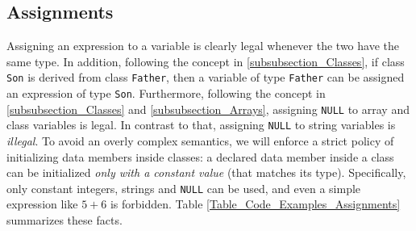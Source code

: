 \documentclass{article}
\begin{document}
\subsection{Assignments}
\label{subsection_Assignments}
Assigning an expression to a variable is clearly legal whenever the two have the same type.
In addition, following the concept in \ref{subsubsection_Classes},
if class \verb"Son" is derived from class \verb"Father",
then a variable of type \verb"Father" can be assigned an expression
of type \verb"Son".
Furthermore, following the concept in \ref{subsubsection_Classes} and \ref{subsubsection_Arrays},
assigning \verb"NULL" to array and class variables is legal.
In contrast to that, assigning \verb"NULL" to string variables is \textit{illegal}.
To avoid an overly complex semantics,
we will enforce a strict policy of initializing data members inside classes:
a declared data member inside a class can be initialized \textit{only with a constant value}
(that matches its type). Specifically, only constant integers, strings and \verb"NULL"
can be used, and even a simple expression like $5+6$ is forbidden.
Table \ref{Table_Code_Examples_Assignments} summarizes these facts.
\end{document}
